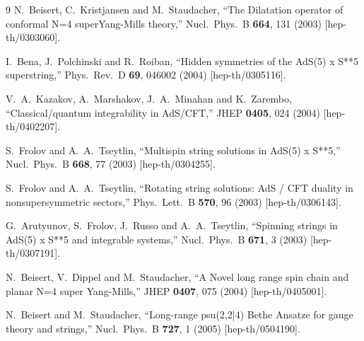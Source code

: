 \documentclass[a4paper]{article}
\numberwithin{equation}{section}
\begin{document}
\begin{thebibliography} {9}
  N.~Beisert, C.~Kristjansen and M.~Staudacher,
  ``The Dilatation operator of conformal N=4 superYang-Mills theory,''
  Nucl.\ Phys.\ B {\bf 664}, 131 (2003)
  [hep-th/0303060].
  
  I.~Bena, J.~Polchinski and R.~Roiban,
  ``Hidden symmetries of the AdS(5) x S**5 superstring,''
  Phys.\ Rev.\ D {\bf 69}, 046002 (2004)
  [hep-th/0305116].
  
  V.~A.~Kazakov, A.~Marshakov, J.~A.~Minahan and K.~Zarembo,
  ``Classical/quantum integrability in AdS/CFT,''
  JHEP {\bf 0405}, 024 (2004)
  [hep-th/0402207].
  
  S.~Frolov and A.~A.~Tseytlin,
  ``Multispin string solutions in AdS(5) x S**5,''
  Nucl.\ Phys.\ B {\bf 668}, 77 (2003)
  [hep-th/0304255].
  
  S.~Frolov and A.~A.~Tseytlin,
  ``Rotating string solutions: AdS / CFT duality in nonsupersymmetric sectors,''
  Phys.\ Lett.\ B {\bf 570}, 96 (2003)
  [hep-th/0306143].
  
  G.~Arutyunov, S.~Frolov, J.~Russo and A.~A.~Tseytlin,
  ``Spinning strings in AdS(5) x S**5 and integrable systems,''
  Nucl.\ Phys.\ B {\bf 671}, 3 (2003)
  [hep-th/0307191].
  
  N.~Beisert, V.~Dippel and M.~Staudacher,
  ``A Novel long range spin chain and planar N=4 super Yang-Mills,''
  JHEP {\bf 0407}, 075 (2004)
  [hep-th/0405001].
  
  N.~Beisert and M.~Staudacher,
  ``Long-range psu(2,2|4) Bethe Ansatze for gauge theory and strings,''
  Nucl.\ Phys.\ B {\bf 727}, 1 (2005)
  [hep-th/0504190].
  

\end{thebibliography}
\end{document}
